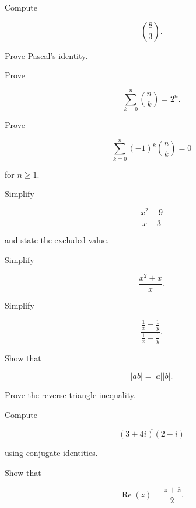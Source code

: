 \begin{exercise}[2]
Compute

\[
\binom{8}{3}.
\]
\end{exercise}

\begin{exercise}[3]
Prove Pascal's identity.
\end{exercise}

\begin{exercise}[3]
Prove

\[
\sum_{k=0}^{n}
\binom{n}{k}
=
2^n.
\]
\end{exercise}

\begin{exercise}[3]
Prove

\[
\sum_{k=0}^{n}
(-1)^k
\binom{n}{k}
=
0
\]

for \(n\geq1\).
\end{exercise}

\begin{exercise}[2]
Simplify

\[
\frac{x^2-9}{x-3}
\]

and state the excluded value.
\end{exercise}

\begin{exercise}[2]
Simplify

\[
\frac{x^2+x}{x}.
\]
\end{exercise}

\begin{exercise}[2]
Simplify

\[
\frac{
\frac1x+\frac1y
}{
\frac1x-\frac1y
}.
\]
\end{exercise}

\begin{exercise}[2]
Show that

\[
|ab|
=
|a||b|.
\]
\end{exercise}

\begin{exercise}[3]
Prove the reverse triangle inequality.
\end{exercise}

\begin{exercise}[2]
Compute

\[
\overline{(3+4i)(2-i)}
\]

using conjugate identities.
\end{exercise}

\begin{exercise}[2]
Show that

\[
\operatorname{Re}(z)
=
\frac{z+\overline z}{2}.
\]
\end{exercise}

